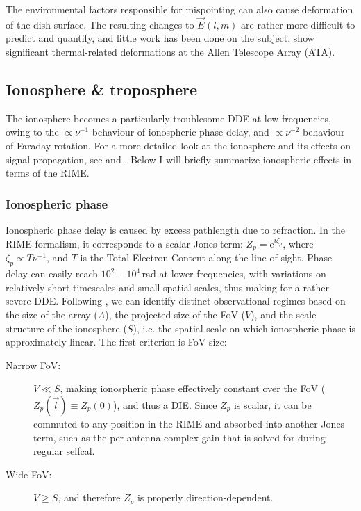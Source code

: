 \documentclass{aa}
\newcommand{\jones}[2]{\vec {#1}_{#2}}
\begin{document}
The environmental factors responsible for mispointing can also cause deformation of the dish surface. The resulting changes to $\jones{E}{}(l,m)$ are rather more difficult to predict and quantify, and little work has been done on the subject. \citet{Harp:ATA-beams} show significant thermal-related deformations at the Allen Telescope Array (ATA).

\subsection{Ionosphere \& troposphere}

The ionosphere becomes a particularly troublesome DDE at low frequencies, owing to the $\propto\nu^{-1}$ behaviour of ionospheric phase delay, and $\propto\nu^{-2}$ behaviour of Faraday rotation. For a more detailed look at the ionosphere and its effects on signal propagation, see \citet[Sect.~13.3]{tms} and \citet{Intema:SPAM}. Below I will briefly summarize ionospheric effects in terms of the RIME.

\subsubsection{Ionospheric phase}

Ionospheric phase delay is caused by excess pathlength due to refraction. In the RIME formalism, it corresponds to a scalar Jones term: $Z_p=\mathrm{e}^{i\zeta_p}$, where $\zeta_p\propto T \nu^{-1}$, and $T$ is the Total Electron Content along the line-of-sight. Phase delay can easily reach $10^2-10^4\,\mathrm{rad}$ at lower frequencies, with variations on relatively short timescales and small spatial scales, thus making for a rather severe DDE. Following \citet{Lonsdale:4regimes}, we can identify distinct observational regimes based on the size of the array ($A$), the projected size of the FoV ($V$), and the scale structure of the ionosphere ($S$), i.e. the spatial scale on which ionospheric phase is approximately linear. The first criterion is FoV size:

\begin{description}
\item[Narrow FoV:] $V\ll S$, making ionospheric phase effectively constant over the FoV ($Z_p(\vec l)\equiv Z_p(0)$), and thus a DIE.
Since $Z_p$ is scalar, it can be commuted to any position in the RIME and absorbed into another Jones term, such as the per-antenna complex gain that is solved for during regular selfcal.
\item[Wide FoV:] $V\ge S$, and therefore $Z_p$ is properly direction-dependent.
\end{description}
\end{document}
